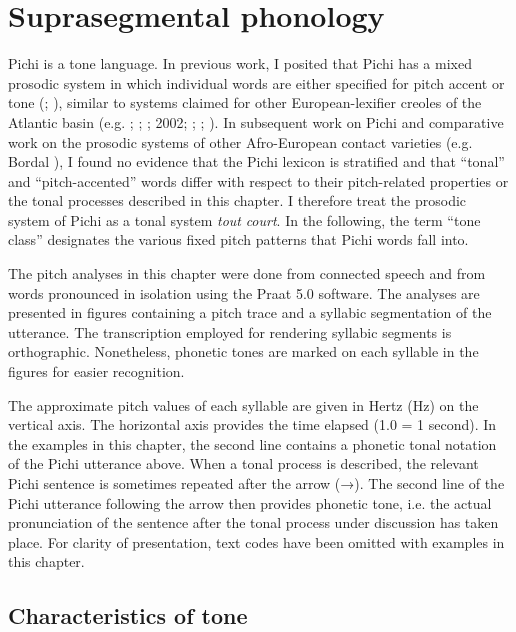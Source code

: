 \chapter{Suprasegmental phonology}

Pichi is a tone language. In previous work, I posited that Pichi has a mixed prosodic system in which individual words are either specified for pitch accent or tone (\citealt{Yakpo2008}; \citealt{Yakpo2009a}), similar to systems claimed for other European-lexifier creoles of the Atlantic basin (e.g. \citealt{Rountree1972}; \citealt{Alleyne1980}; \citealt{Devonish1989}; 2002; \citealt{Good2004}; \citealt{Castillo1998}; \citealt{CastilloFaraclas2006}). In subsequent work on Pichi and comparative work on the  prosodic systems of other Afro-European contact varieties (e.g. Bordal \citealt{SteienYakpo2017}), I found no evidence that the Pichi lexicon is stratified and that “tonal” and “pitch-accented” words differ with respect to their pitch-related properties or the tonal processes described in this chapter. I therefore treat the prosodic system of Pichi as a tonal system \textit{tout} \textit{court}. In the following, the term “tone class” designates the various fixed pitch patterns that Pichi words fall into. 


The pitch analyses in this chapter were done from connected speech and from words pronounced in isolation using the Praat 5.0 software. The analyses are presented in figures containing a pitch trace and a syllabic segmentation of the utterance. The transcription employed for rendering syllabic segments is orthographic. Nonetheless, phonetic tones are marked on each syllable in the figures for easier recognition.



The approximate pitch values of each syllable are given in Hertz (Hz) on the vertical axis. The horizontal axis provides the time elapsed (1.0 = 1 second). In  the examples in this chapter, the second line contains a phonetic tonal notation of the Pichi utterance above. When a tonal process is described, the relevant Pichi sentence is sometimes repeated after the arrow (→). The second line of the Pichi utterance following the arrow then provides phonetic tone, i.e. the actual pronunciation of the sentence after the tonal process under discussion has taken place. For clarity of presentation, text codes have been omitted with examples in this chapter.


\section{Characteristics of tone}\label{sec:3.1}

